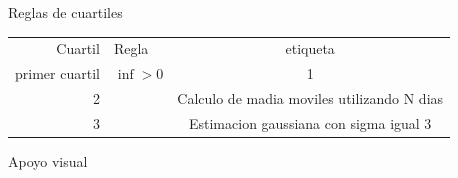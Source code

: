 Reglas de cuartiles
\begin{center}
	\begin{tabular}{ |r | l | c| }
		 \hline
		Cuartil & Regla & etiqueta \\
		primer cuartil & $\inf > 0$ & 1 \\
		2 &   & Calculo de madia moviles utilizando N dias\\ 
		3 &     &Estimacion gaussiana con sigma igual 3 \\
		 \hline
	\end{tabular}
\end{center}



Apoyo visual 
